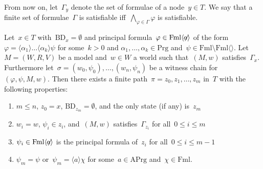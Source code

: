 \documentclass{entcs}
\newcommand{\pea}[2]{\langle#1\rangle #2}
\newcommand{\fml}{\mathrm{Fml}}
\newcommand{\prg}{\mathrm{Prg}}
\newcommand{\act}{\mathrm{APrg}}
\newcommand{\fmlea}{\mathrm{Fml}\pea{}{}}
\newcommand{\fmlean}{\mathrm{Fml}\pea{\not\!\!a}{}}
\newcommand{\tbdia}{\mathrm{BD}}
\newcommand{\fchn}{\sigma}
\begin{document}
From now on,
let~$\Gamma_y$ denote the set of formulae of a node~$y \in T$.
We say that a finite set of formulae~$\Gamma$ is satisfiable
iff~$\bigwedge_{\varphi \in \Gamma}\varphi$ is satisfiable.
\begin{lemma}
  \label{lemma_focus}
  Let~$x \in T$ with~$\tbdia_x = \emptyset$ and principal formula~$\varphi \in \fmlean$
  of the form~$\varphi = \pea{\alpha_1}{\dotsc \pea{\alpha_k}{\psi}}$
  for some~$k > 0$ and $\alpha_1, \dots, \alpha_k \in \prg$ and~$\psi \in \fml \setminus \fmlea$.
  Let~$M = (W,R,V)$ be a model and~$w \in W$ a world such that~$(M, w)$ satisfies~$\Gamma_x$.
  Furthermore let~$\fchn = (w_0, \psi_0), \dotsc, (w_n, \psi_n)$ be a witness chain for~$(\varphi, \psi, M, w)$.
  Then there exists a finite path~$\pi = z_0, z_1, \dotsc, z_m$ in~$T$
  with the following properties:
  \renewcommand{\theenumi}{(\roman{enumi})}
  \renewcommand{\labelenumi}{\theenumi}
  \begin{enumerate}
  \item $m \leq n$, $z_0 = x$, $\tbdia_{z_m} = \emptyset$, and the only state (if any) is~$z_m$
  \item $w_i = w$, $\psi_i \in z_i$, and~$(M, w)$ satisfies~$\Gamma_{z_i}$ for all~$0 \leq i \leq m$
  \item $\psi_i \in \fmlean$ is the principal formula of~$z_i$ for all~$0 \leq i \leq m-1$
  \item $\psi_m = \psi$ or~$\psi_m = \pea{a}{\chi}$ for some~$a \in \act$ and~$\chi \in \fml$.
  \end{enumerate}
\end{lemma}
\end{document}
